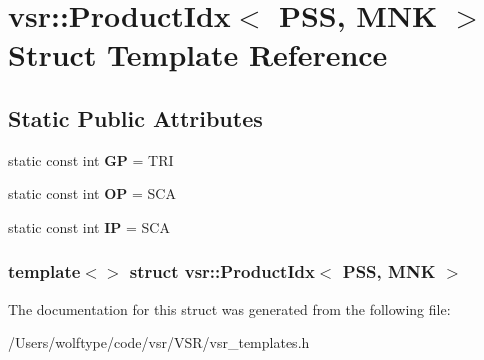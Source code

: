 \hypertarget{structvsr_1_1_product_idx_3_01_p_s_s_00_01_m_n_k_01_4}{\section{vsr\-:\-:Product\-Idx$<$ P\-S\-S, M\-N\-K $>$ Struct Template Reference}
\label{structvsr_1_1_product_idx_3_01_p_s_s_00_01_m_n_k_01_4}
}
\subsection*{Static Public Attributes}
\begin{DoxyCompactItemize}
\item 
\hypertarget{structvsr_1_1_product_idx_3_01_p_s_s_00_01_m_n_k_01_4_abe81fbff59d47540efa681382f369a45}{static const int {\bfseries G\-P} = T\-R\-I}\label{structvsr_1_1_product_idx_3_01_p_s_s_00_01_m_n_k_01_4_abe81fbff59d47540efa681382f369a45}

\item 
\hypertarget{structvsr_1_1_product_idx_3_01_p_s_s_00_01_m_n_k_01_4_a0fc66a2da4f43a65939548da60757d83}{static const int {\bfseries O\-P} = S\-C\-A}\label{structvsr_1_1_product_idx_3_01_p_s_s_00_01_m_n_k_01_4_a0fc66a2da4f43a65939548da60757d83}

\item 
\hypertarget{structvsr_1_1_product_idx_3_01_p_s_s_00_01_m_n_k_01_4_a042737701d839dbe135b70b59be45275}{static const int {\bfseries I\-P} = S\-C\-A}\label{structvsr_1_1_product_idx_3_01_p_s_s_00_01_m_n_k_01_4_a042737701d839dbe135b70b59be45275}

\end{DoxyCompactItemize}
\subsubsection*{template$<$$>$ struct vsr\-::\-Product\-Idx$<$ P\-S\-S, M\-N\-K $>$}



The documentation for this struct was generated from the following file\-:\begin{DoxyCompactItemize}
\item 
/\-Users/wolftype/code/vsr/\-V\-S\-R/vsr\-\_\-templates.\-h\end{DoxyCompactItemize}

